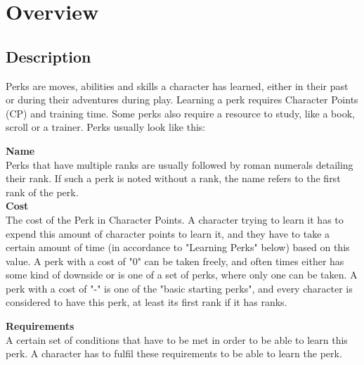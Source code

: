 \chapter{Overview}\label{ch:perksOverview}


\section{Description}\label{sec:perkDescription}
Perks are moves, abilities and skills a character has learned, either in their past or during their adventures during play.
Learning a perk requires Character Points (CP) and training time.
Some perks also require a resource to study, like a book, scroll or a trainer.
Perks usually look like this:

\textbf{Name}\\
Perks that have multiple ranks are usually followed by roman numerals detailing their rank.
If such a perk is noted without a rank, the name refers to the first rank of the perk.\\

\textbf{Cost}\\
The cost of the Perk in Character Points.
A character trying to learn it has to expend this amount of character points to learn it, and they have to take a certain amount of time (in accordance to "Learning Perks" below) based on this value. A perk with a cost of "0" can be taken freely, and often times either has some kind of downside or is one of a set of perks, where only one can be taken. A perk with a cost of "-" is one of the "basic starting perks", and every character is considered to have this perk, at least its first rank if it has ranks.

\textbf{Requirements}\\
A certain set of conditions that have to be met in order to be able to learn this perk.
A character has to fulfil these requirements to be able to learn the perk.


